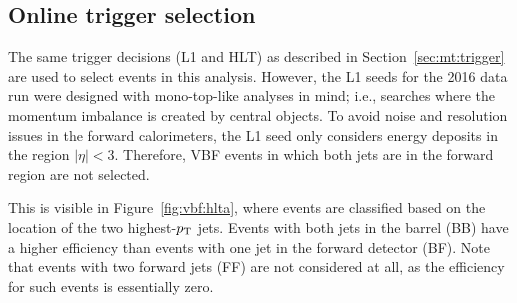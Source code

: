 \subsection{Online trigger selection}
\label{sec:vbf:trig}

The same trigger decisions (L1 and HLT) as described in Section~\ref{sec:mt:trigger} are used to select events in this analysis.
However, the L1 seeds for the 2016 data run were designed with mono-top-like analyses in mind; i.e., searches where the momentum imbalance is created by central objects.
To avoid noise and resolution issues in the forward calorimeters, the L1 seed only considers energy deposits in the region ${|\eta|<3}$. 
Therefore, VBF events in which both jets are in the forward region are not selected.  

This is visible in Figure~\ref{fig:vbf:hlta}, where events are classified based on the location of the two highest-$p_\mathrm{T}$ jets.
Events with both jets in the barrel (BB) have a higher efficiency than events with one jet in the forward detector (BF).
Note that events with two forward jets (FF) are not considered at all, as the efficiency for such events is essentially zero. 

